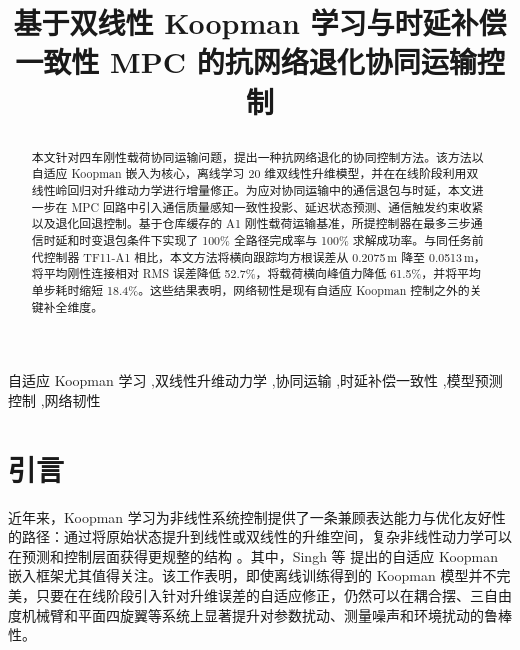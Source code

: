 \documentclass[twocolumn,3p,times,procedia]{elsarticle}
\newcommand{\tfone}{TF11-A1}
\begin{document}
\small
\begin{frontmatter}

\dochead{}
\title{
\begin{flushleft}
{\LARGE 基于双线性 Koopman 学习与时延补偿一致性 MPC 的抗网络退化协同运输控制}
\end{flushleft}
}

\author[]{}

\address{
}


\begin{abstract}
本文针对四车刚性载荷协同运输问题，提出一种抗网络退化的协同控制方法。该方法以自适应 Koopman 嵌入为核心，离线学习 20 维双线性升维模型，并在在线阶段利用双线性岭回归对升维动力学进行增量修正。为应对协同运输中的通信退包与时延，本文进一步在 MPC 回路中引入通信质量感知一致性投影、延迟状态预测、通信触发约束收紧以及退化回退控制。基于仓库缓存的 A1 刚性载荷运输基准，所提控制器在最多三步通信时延和时变退包条件下实现了 100\% 全路径完成率与 100\% 求解成功率。与同任务前代控制器 \tfone{} 相比，本文方法将横向跟踪均方根误差从 0.2075\,m 降至 0.0513\,m，将平均刚性连接相对 RMS 误差降低 52.7\%，将载荷横向峰值力降低 61.5\%，并将平均单步耗时缩短 18.4\%。这些结果表明，网络韧性是现有自适应 Koopman 控制之外的关键补全维度。
\end{abstract}

\begin{keyword}
自适应 Koopman 学习 \sep 双线性升维动力学 \sep 协同运输 \sep 时延补偿一致性 \sep 模型预测控制 \sep 网络韧性
\end{keyword}

\end{frontmatter}

\section{引言}
近年来，Koopman 学习为非线性系统控制提供了一条兼顾表达能力与优化友好性的路径：通过将原始状态提升到线性或双线性的升维空间，复杂非线性动力学可以在预测和控制层面获得更规整的结构 \cite{singh2024adaptive,bruder2021advantages,folkestad2021koopman}。其中，Singh 等 \cite{singh2024adaptive} 提出的自适应 Koopman 嵌入框架尤其值得关注。该工作表明，即使离线训练得到的 Koopman 模型并不完美，只要在在线阶段引入针对升维误差的自适应修正，仍然可以在耦合摆、三自由度机械臂和平面四旋翼等系统上显著提升对参数扰动、测量噪声和环境扰动的鲁棒性。
\end{document}
